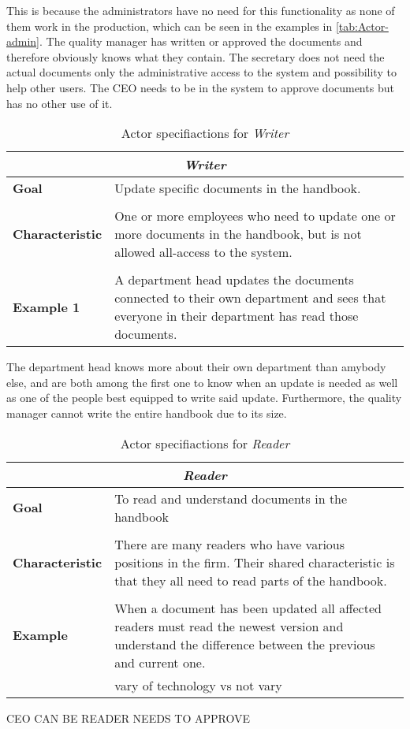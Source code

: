 This is because the administrators have no need for this functionality as none of them work in the production, which can be seen in the examples in \cref{tab:Actor-admin}.
The quality manager has written or approved the documents and therefore obviously knows what they contain.
The secretary does not need the actual documents only the administrative access to the system and possibility to help other users.
The CEO needs to be in the system to approve documents but has no other use of it.

\begin{table}[H]
	\begin{tabular}{l m{11.3cm}}
		\hline
		\multicolumn{2}{c}{\textbf{\textit{Writer}}}\\
		\hline
		\textbf{Goal} & Update specific documents in the handbook. \\
	 	 &  \\
		\textbf{Characteristic} &  One or more employees who need to update one or more documents in the handbook, but is not allowed all-access to the system. \\
		 &  \\
		\textbf{Example 1} 
		& A department head updates the documents connected to their own department and sees that everyone in their department has read those documents.\\
		\hline
	\end{tabular}
	\caption{Actor specifiactions for \textit{Writer}}\label{tab:Actor-write}
\end{table}

The department head knows more about their own department than amybody else, and are both among the first one to know when an update is needed as well as one of the people best equipped to write said update.
Furthermore, the quality manager cannot write the entire handbook due to its size.

\begin{table}[H]
	\begin{tabular}{l m{11.3cm}}
		\hline
		\multicolumn{2}{c}{\textbf{\textit{Reader}}}\\
		\hline
		\textbf{Goal} & To read and understand documents in the handbook \\
		 &  \\
		\textbf{Characteristic} & There are many readers who have various positions in the firm. Their shared characteristic is that they all need to read parts of the handbook. \\
		 &  \\
		\textbf{Example} & When a document has been updated all affected readers must read the newest version and understand the difference between the previous and current one. \\
		& vary of technology vs not vary\\
		\hline
	\end{tabular}
	\caption{Actor specifiactions for \textit{Reader}}\label{tab:Actor-read}
\end{table}

CEO CAN BE READER NEEDS TO APPROVE
